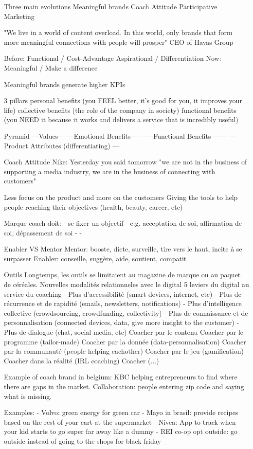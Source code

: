 Three main evolutions
    Meaningful brands
    Coach Attitude
    Participative Marketing

"We live in a world of content overload. In this world, only brands that form more meaningful connections with people will prosper"
CEO of Havas Group

Before:
    Functional / Cost-Advantage
    Aspirational / Differentiation
Now:
    Meaningful / Make a difference

Meaningful brands generate higher KPIs

3 pillars
    personal benefits (you FEEL better, it's good for you, it improves your life)
    collective benefits (the role of the company in society)
    functional benefits (you NEED it because it works and delivers a service that is incredibly useful)

Pyramid
         ---Values---
    ---Emotional Benefits---
  ------Functional Benefits ------
---Product Attributes (differentiating) ---


Coach Attitude
    Nike: Yesterday you said tomorrow
    "we are not in the business of supporting a media industry, we are in the business of connecting with customers"

    Less focus on the product and more on the customers
    Giving the tools to help people reaching their objectives (health, beauty, career, etc)

    Marque coach doit:
        - se fixer un objectif
            - e.g. acceptation de soi, affirmation de soi, dépassement de soi
        -
        -

    Enabler VS Mentor
        Mentor: booste, dicte, surveille, tire vers le haut, incite à se surpasser
        Enabler: conseille, suggère, aide, soutient, compatit

    Outils
        Longtemps, les outils se limitaient au magazine de marque ou au paquet de céréales.
        Nouvelles modalités relationneles avec le digital
        5 leviers du digital au service du coaching
            - Plus d'accessibilité (smart devices, internet, etc)
            - Plus de récurrence et de rapidité (emails, newsletters, notifications)
            - Plus d'intelligence collective (crowdsourcing, crowdfunding, collectivity)
            - Plus de connaissance et de personnalisation (connected devices, data, give more insight to the customer)
            - Plus de dialogue (chat, social media, etc)
        Coacher par le contenu
        Coacher par le programme (tailor-made)
        Coacher par la donnée (data-personnalisation)
        Coacher par la communauté (people helping eachother)
        Coacher par le jeu (gamification)
        Coacher dans la réalité (IRL coaching)
        Coacher (...)

    Example of coach brand in belgium: KBC helping entrepreneurs to find where there are gaps in the market. Collaboration: people entering zip code and saying what is missing.


Examples:
    - Volvo: green energy for green car
    - Mayo in brasil: provide recipes based on the rest of your cart at the supermarket
    - Nivea: App to track when your kid starts to go super far away like a dummy
    - REI co-op opt outside: go outside instead of going to the shops for black friday
